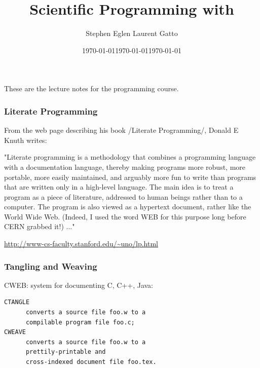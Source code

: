 \documentclass[]{beamer}\usepackage[]{graphicx}\usepackage[]{color}
\author{
  Stephen Eglen
  Laurent Gatto
}
\date{\today}
\title{Scientific Programming with \R}
\begin{document}
\lstset{language=R}

{
  \date{\today}
  \maketitle

  These are the lecture notes for the programming course.
}


{
  \date{\today}
  \maketitle
}





\begin{frame}
  \frametitle{Literate Programming}

  From the web page describing his book /Literate Programming/, Donald E
  Knuth writes:

  "Literate programming is a methodology that combines a programming
  language with a documentation language, thereby making programs more
  robust, more portable, more easily maintained, and arguably more fun
  to write than programs that are written only in a high-level
  language. The main idea is to treat a program as a piece of
  literature, addressed to human beings rather than to a computer. The
  program is also viewed as a hypertext document, rather like the World
  Wide Web. (Indeed, I used the word WEB for this purpose long before
  CERN grabbed it!) ..."

  \bigskip

  \url{http://www-cs-faculty.stanford.edu/~uno/lp.html}

\end{frame}


\begin{frame}[fragile]
  \frametitle{Tangling and Weaving}

  CWEB: system for documenting C, C++, Java:

\begin{verbatim}
CTANGLE
      converts a source file foo.w to a
      compilable program file foo.c; 
CWEAVE
      converts a source file foo.w to a
      prettily-printable and 
      cross-indexed document file foo.tex. 
\end{verbatim}

\end{frame}
\end{document}
